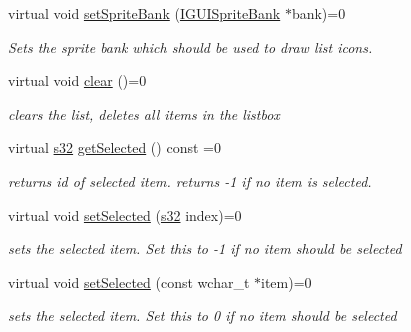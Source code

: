 \begin{DoxyCompactItemize}
virtual void \hyperlink{classirr_1_1gui_1_1IGUIListBox_ad139cef6f71bb8d36624b48e8a695ed4}{set\+Sprite\+Bank} (\hyperlink{classirr_1_1gui_1_1IGUISpriteBank}{I\+G\+U\+I\+Sprite\+Bank} $\ast$bank)=0
\begin{DoxyCompactList}\small\item\em Sets the sprite bank which should be used to draw list icons. \end{DoxyCompactList}\item 
\mbox{\label{classirr_1_1gui_1_1IGUIListBox_aaffa1f9f823dbb254c1901dba67e31c4}} 
virtual void \hyperlink{classirr_1_1gui_1_1IGUIListBox_aaffa1f9f823dbb254c1901dba67e31c4}{clear} ()=0
\begin{DoxyCompactList}\small\item\em clears the list, deletes all items in the listbox \end{DoxyCompactList}\item 
\mbox{\label{classirr_1_1gui_1_1IGUIListBox_a321626d92d63ce5c309466201a02b12d}} 
virtual \hyperlink{namespaceirr_ac66849b7a6ed16e30ebede579f9b47c6}{s32} \hyperlink{classirr_1_1gui_1_1IGUIListBox_a321626d92d63ce5c309466201a02b12d}{get\+Selected} () const =0
\begin{DoxyCompactList}\small\item\em returns id of selected item. returns -\/1 if no item is selected. \end{DoxyCompactList}\item 
\mbox{\label{classirr_1_1gui_1_1IGUIListBox_ac981fa5b285115333b67202819230f6f}} 
virtual void \hyperlink{classirr_1_1gui_1_1IGUIListBox_ac981fa5b285115333b67202819230f6f}{set\+Selected} (\hyperlink{namespaceirr_ac66849b7a6ed16e30ebede579f9b47c6}{s32} index)=0
\begin{DoxyCompactList}\small\item\em sets the selected item. Set this to -\/1 if no item should be selected \end{DoxyCompactList}\item 
\mbox{\label{classirr_1_1gui_1_1IGUIListBox_aa6031e2a0ecbcfe80484d8271b1c9529}} 
virtual void \hyperlink{classirr_1_1gui_1_1IGUIListBox_aa6031e2a0ecbcfe80484d8271b1c9529}{set\+Selected} (const wchar\+\_\+t $\ast$item)=0
\begin{DoxyCompactList}\small\item\em sets the selected item. Set this to 0 if no item should be selected \end{DoxyCompactList}\item 

\end{DoxyCompactItemize}
